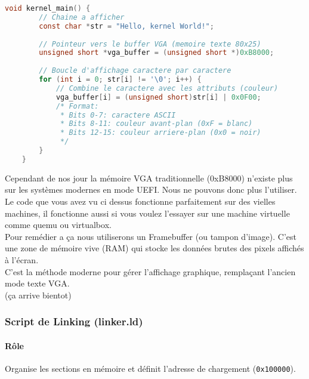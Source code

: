 \documentclass{article}
\begin{document}
\begin{lstlisting}[language=C]
    void kernel_main() {
        // Chaine a afficher
        const char *str = "Hello, kernel World!";
        
        // Pointeur vers le buffer VGA (memoire texte 80x25)
        unsigned short *vga_buffer = (unsigned short *)0xB8000;
        
        // Boucle d'affichage caractere par caractere
        for (int i = 0; str[i] != '\0'; i++) {
            // Combine le caractere avec les attributs (couleur)
            vga_buffer[i] = (unsigned short)str[i] | 0x0F00; 
            /* Format: 
             * Bits 0-7: caractere ASCII
             * Bits 8-11: couleur avant-plan (0xF = blanc)
             * Bits 12-15: couleur arriere-plan (0x0 = noir)
             */
        }
    }
\end{lstlisting}
Cependant de nos jour la mémoire VGA traditionnelle (0xB8000) n'existe plus sur les systèmes modernes en mode UEFI. 
Nous ne pouvons donc plus l'utiliser.\\Le code que vous avez vu ci dessus fonctionne parfaitement sur des vielles machines, il fonctionne aussi si vous voulez l'essayer sur une machine virtuelle comme quemu ou virtualbox.
\\ Pour remédier a ça nous utiliserons un Framebuffer (ou tampon d'image). C'est une zone de mémoire vive (RAM) qui stocke les données brutes des pixels affichés à l'écran.\\C'est la méthode moderne pour gérer l'affichage graphique, remplaçant l'ancien mode texte VGA.
\\(ça arrive bientot)
\newpage
\subsubsection*{Script de Linking (linker.ld)}
\paragraph{Rôle}
Organise les sections en mémoire et définit l'adresse de chargement (\texttt{0x100000}).
\end{document}
